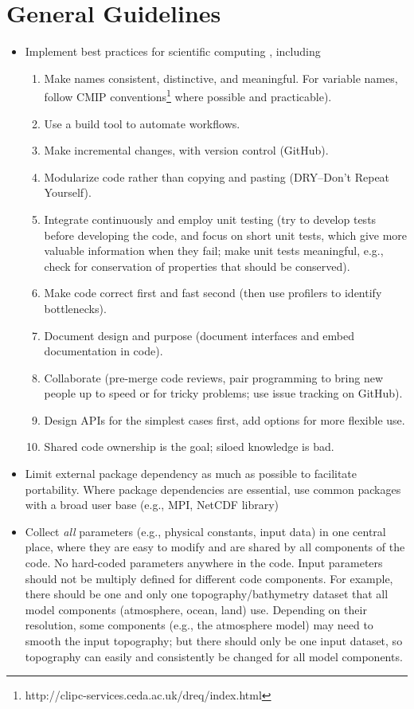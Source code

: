 \documentclass{article}
\begin{document}
\section{General Guidelines}

\begin{itemize}
    \item Implement best practices for scientific computing \citep[e.g.,][]{Wilson14a}, including
        \begin{enumerate}
            \item Make names consistent, distinctive, and meaningful. For variable names, follow CMIP conventions\footnote{http://clipc-services.ceda.ac.uk/dreq/index.html} where possible and practicable).
            \item Use a build tool to automate workflows.
            \item Make incremental changes, with version control (GitHub).
            \item Modularize code rather than copying and pasting (DRY--Don't Repeat Yourself).
            \item Integrate continuously and employ unit testing (try to develop tests before developing the code, and focus on short unit tests, which give more valuable information when they fail; make unit tests meaningful, e.g., check for conservation of properties that should be conserved).
            \item Make code correct first and fast second (then use profilers to identify bottlenecks).
            \item Document design and purpose (document interfaces and embed documentation in code).
            \item Collaborate (pre-merge code reviews, pair programming to bring new people up to speed or for tricky problems; use issue tracking on GitHub).
            \item Design APIs for the simplest cases first, add options for more flexible use.
            \item Shared code ownership is the goal; siloed knowledge is bad.
        \end{enumerate}
    \item Limit external package dependency as much as possible to facilitate portability. Where package dependencies are essential, use common packages with a broad user base (e.g., MPI, NetCDF library)
    \item Collect \emph{all} parameters (e.g., physical constants, input data) in one central place, where they are easy to modify and are shared by all components of the code. No hard-coded parameters anywhere in the code. Input parameters should not be multiply defined for different code components. For example, there should be one and only one topography/bathymetry dataset that all model components (atmosphere, ocean, land) use. Depending on their resolution, some components (e.g., the atmosphere model) may need to smooth the input topography; but there should only be one input dataset, so topography can easily and consistently be changed for all model components.

\end{itemize}
\end{document}
